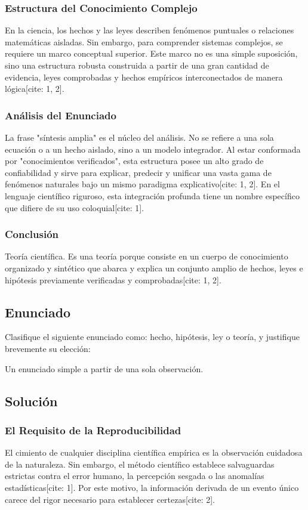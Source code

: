 \documentclass[12pt, a4paper]{article}
\begin{document}
\subsubsection*{Estructura del Conocimiento Complejo}
En la ciencia, los hechos y las leyes describen fenómenos puntuales o relaciones matemáticas aisladas. Sin embargo, para comprender sistemas complejos, se requiere un marco conceptual superior. Este marco no es una simple suposición, sino una estructura robusta construida a partir de una gran cantidad de evidencia, leyes comprobadas y hechos empíricos interconectados de manera lógica[cite: 1, 2].

\subsubsection*{Análisis del Enunciado}
La frase "síntesis amplia" es el núcleo del análisis. No se refiere a una sola ecuación o a un hecho aislado, sino a un modelo integrador. Al estar conformada por "conocimientos verificados", esta estructura posee un alto grado de confiabilidad y sirve para explicar, predecir y unificar una vasta gama de fenómenos naturales bajo un mismo paradigma explicativo[cite: 1, 2]. En el lenguaje científico riguroso, esta integración profunda tiene un nombre específico que difiere de su uso coloquial[cite: 1].

\subsubsection*{Conclusión}
Teoría científica. Es una teoría porque consiste en un cuerpo de conocimiento organizado y sintético que abarca y explica un conjunto amplio de hechos, leyes e hipótesis previamente verificadas y comprobadas[cite: 1, 2].

\newpage

\subsection*{Enunciado}
Clasifique el siguiente enunciado como: hecho, hipótesis, ley o teoría, y justifique brevemente su elección: 

Un enunciado simple a partir de una sola observación.

\subsection*{Solución}

\subsubsection*{El Requisito de la Reproducibilidad}
El cimiento de cualquier disciplina científica empírica es la observación cuidadosa de la naturaleza. Sin embargo, el método científico establece salvaguardas estrictas contra el error humano, la percepción sesgada o las anomalías estadísticas[cite: 1]. Por este motivo, la información derivada de un evento único carece del rigor necesario para establecer certezas[cite: 2].
\end{document}
